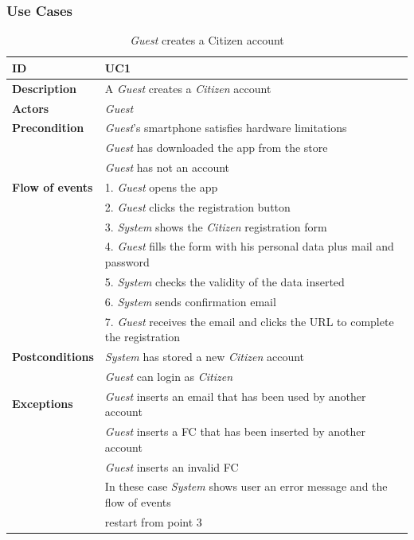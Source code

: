 \documentclass{article}
\begin{document}
\subsubsection{Use Cases}
\clearpage
\begin{table}
    \begin{center}
    \centering
\begin{tabular}{ | l | l |}
\hline
\textbf{ID} & UC1 \\
\hline
\textbf{Description} & A \textit{Guest} creates a \textit{Citizen} account \\
\hline
\textbf{Actors} & \textit{Guest} \\
\hline
\textbf{Precondition} & \textit{Guest}'s smartphone satisfies hardware limitations \\
             & \textit{Guest} has downloaded the app from the store \\
             & \textit{Guest} has not an account\\ 
\hline
\textbf{Flow of events} & 1. \textit{Guest} opens the app \\
                        & 2. \textit{Guest} clicks the registration button \\
                        & 3. \textit{System} shows the \textit{Citizen} registration form \\
                        & 4. \textit{Guest} fills the form with his personal data plus mail and password \\
                        & 5. \textit{System} checks the validity of the data inserted \\
                        & 6. \textit{System} sends confirmation email \\
                        & 7. \textit{Guest} receives the email and clicks the URL to complete the registration \\  
\hline
\textbf{Postconditions} & \textit{System} has stored a new \textit{Citizen} account  \\
                        & \textit{Guest} can login as \textit{Citizen} \\
\hline
\textbf{Exceptions} & \textit{Guest} inserts an email that has been used by another account \\
                    & \textit{Guest} inserts a FC that has been inserted by another account \\
                    & \textit{Guest} inserts an invalid FC \\
                    & In these case \textit{System} shows user an error message and the flow of events  \\
                    & restart from point 3 \\  
\hline
\end{tabular}
\caption{\textit{Guest} creates a Citizen account}
\end{center}
\end{table}
\end{document}
